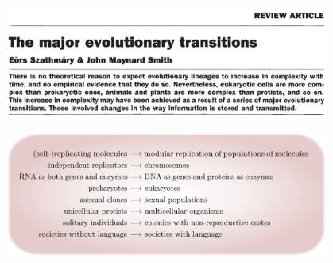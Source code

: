 \begin{frame}
\begin{center}
\includegraphics[width=0.8\textwidth]{fig/MajorEvolutionaryTransitions.png}

\includegraphics[width=0.8\textwidth]{fig/MajorTransitionsList.pdf}
\end{center}
\cite{Szathmary1995}
\end{frame}